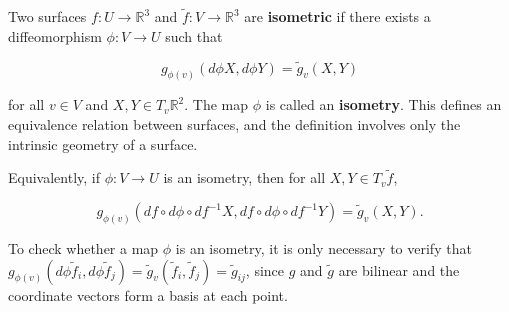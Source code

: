 Two surfaces $f: U \to \mathbb{R}^3$ and $\tilde{f}: V \to \mathbb{R}^3$ are \textbf{isometric} if there exists a diffeomorphism $\phi: V \to U$ such that

$$g_{\phi(v)}(d\phi X, d\phi Y) = \tilde{g}_v(X, Y)$$

for all $v \in V$ and $X, Y \in T_v \mathbb{R}^2$. The map $\phi$ is called an \textbf{isometry}. This defines an equivalence relation between surfaces, and the definition involves only the intrinsic geometry of a surface.

Equivalently, if $\phi: V \to U$ is an isometry, then for all $X, Y \in T_v \tilde{f}$,

$$g_{\phi(v)}(df \circ d\phi \circ df^{-1}X, df \circ d\phi \circ df^{-1}Y) = \tilde{g}_v(X, Y).$$

To check whether a map $\phi$ is an isometry, it is only necessary to verify that $g_{\phi(v)}(d\phi \tilde{f}_i, d\phi \tilde{f}_j) = \tilde{g}_v(\tilde{f}_i, \tilde{f}_j) = \tilde{g}_{ij}$, since $g$ and $\tilde{g}$ are bilinear and the coordinate vectors form a basis at each point.
